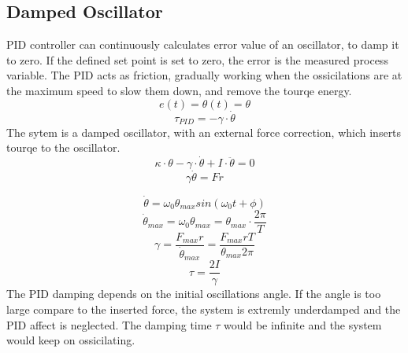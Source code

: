 \documentclass[\main/master.tex]{subfiles}
\begin{document}
\subsection{Damped Oscillator}
PID controller can continuously calculates error value of an oscillator, to damp it to zero. If the defined set point is set to zero, the error is the measured process variable. The PID acts as friction, gradually working when the ossicilations are at the maximum speed to slow them down, and remove the tourqe energy.
\begin{equation}
e(t) = \theta(t) = \theta   \label{eqn:error}
\end{equation}
\begin{equation}
\tau_{PID} = -\gamma\cdot\dot{\theta}   \label{eqn:friction_tourqe}
\end{equation}
The sytem is a damped oscillator, with an external force correction, which inserts tourqe to the oscillator.
\begin{equation}
\kappa\cdot\theta - \gamma\cdot\dot{\theta}  + I\cdot\ddot{\theta} = 0   \label{eqn:damped__pid_motion_equation}
\end{equation}
\begin{equation}
\gamma\dot{\theta}  = Fr   \label{eqn:damped__pid_motion_equation}
\end{equation}

\begin{equation}
\dot{\theta} = \omega_0\theta_{max}sin(\omega_0 t +\phi)    \label{eqn:undamped_motion_equation}
\end{equation}
\begin{equation}
\dot{\theta}_{max} = \omega_0\theta_{max} = \theta_{max}\cdot\frac{2\pi}{T}    \label{eqn:undamped_motion_equation}
\end{equation}
\begin{equation}
\gamma  = \frac{F_{max}r}{\dot{\theta}_{max}} =\frac{F_{max}rT}{\theta_{max}2\pi}    \label{eqn:damped_pid_motion_equation}
\end{equation}
\begin{equation}
\tau =  \frac{2I}{\gamma}  \label{eqn:damping_time}
\end{equation}
The PID damping depends on the initial oscillations angle. If the angle is too large compare to the inserted force, the system is extremly underdamped and the PID affect is neglected. The damping time $\tau$ would be infinite and the system would keep on ossicilating.
\end{document}

